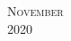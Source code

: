 \documentclass[10pt]{article} %
\begin{document}
\pagestyle{empty} %

\setlength{\parindent}{0pt} %



\begin{center}
	\textsc{\LARGE November}\\ %
	\textsc{\large 2020} %
\end{center}

\end{document}
